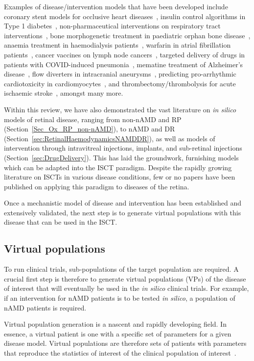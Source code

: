 \documentclass{article}
\begin{document}
Examples of disease/intervention models that have been developed include coronary stent models for occlusive heart diseases~\cite{Antonini2021, Berti2021}, insulin control algorithms in Type 1 diabetes~\cite{Kovatchev2009}, non-pharmaceutical interventions on respiratory tract interventions~\cite{Arsene2022}, bone morphogenetic treatment in paediatric orphan bone disease~\cite{Carlier2018}, anaemia treatment in haemodialysis patients~\cite{Fuertinger2018}, warfarin in atrial fibrillation patients~\cite{Ravvaz2017}, cancer vaccines on lymph node cancers~\cite{Gaffney2022}, targeted delivery of drugs in patients with COVID-induced pneumonia~\cite{Wang2022}, mematine treatment of Alzheimer’s disease~\cite{Swietlik2022}, flow diverters in intracranial aneurysms~\cite{SarramiForoushani2021}, predicting pro-arrhythmic cardiotoxicity in cardiomyocytes~\cite{Passini2017}, and thrombectomy/thrombolysis for acute ischaemic stroke~\cite{Konduri2020}, amongst many more.

Within this review, we have also demonstrated the vast literature on \textit{in silico} models of retinal disease, ranging from non-nAMD and RP (Section~\ref{Sec_Ox_RP_non-nAMD}), to nAMD and DR (Section~\ref{sec:RetinalHaemodynamicsNAMDDR}), as well as models of intervention through intravitreal injections, implants, and sub-retinal injections (Section~\ref{sec:DrugDelivery}).
This has laid the groundwork, furnishing models which can be adapted into the ISCT paradigm. Despite the rapidly growing literature on ISCTs in various disease conditions, few or no papers have been published on applying this paradigm to diseases of the retina.

Once a mechanistic model of disease and intervention has been established and extensively validated, the next step is to generate virtual populations with this disease that can be used in the ISCT.

\subsection{Virtual populations}

To run clinical trials, sub-populations of the target population are required. A crucial first step is therefore to generate virtual populations (VPs) of the disease of interest that will eventually be used in the \textit{in silico} clinical trials. For example, if an intervention for nAMD patients is to be tested \textit{in silico}, a population of nAMD patients is required.

Virtual population generation is a nascent and rapidly developing field. In essence, a virtual patient is one with a specific set of parameters for a given disease model. Virtual populations are therefore sets of patients with parameters that reproduce the statistics of interest of the clinical population of interest~\cite{Allen2016}.
\end{document}
